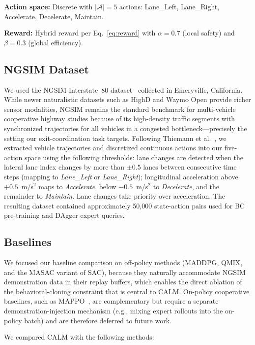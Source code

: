 \documentclass[journal]{IEEEtran}
\newcommand{\cA}{\mathcal{A}}
\begin{document}
\textbf{Action space:} Discrete with $|\cA| = 5$ actions: Lane\_Left, Lane\_Right, Accelerate, Decelerate, Maintain.

\textbf{Reward:} Hybrid reward per Eq.~\eqref{eq:reward} with $\alpha = 0.7$ (local safety) and $\beta = 0.3$ (global efficiency).

\subsection{NGSIM Dataset}

We used the NGSIM Interstate~80 dataset~\cite{ngsim2006} collected in Emeryville, California. While newer naturalistic datasets such as HighD and Waymo Open provide richer sensor modalities, NGSIM remains the standard benchmark for multi-vehicle cooperative highway studies because of its high-density traffic segments with synchronized trajectories for all vehicles in a congested bottleneck---precisely the setting our exit-coordination task targets. Following Thiemann et al.~\cite{thiemann2008estimating}, we extracted vehicle trajectories and discretized continuous actions into our five-action space using the following thresholds: lane changes are detected when the lateral lane index changes by more than $\pm 0.5$ lanes between consecutive time steps (mapping to \emph{Lane\_Left} or \emph{Lane\_Right}); longitudinal acceleration above $+0.5$~m/s$^2$ maps to \emph{Accelerate}, below $-0.5$~m/s$^2$ to \emph{Decelerate}, and the remainder to \emph{Maintain}. Lane changes take priority over acceleration. The resulting dataset contained approximately 50,000 state-action pairs used for BC pre-training and DAgger expert queries.

\subsection{Baselines}

We focused our baseline comparison on off-policy methods (MADDPG, QMIX, and the MASAC variant of SAC), because they naturally accommodate NGSIM demonstration data in their replay buffers, which enables the direct ablation of the behavioral-cloning constraint that is central to CALM. On-policy cooperative baselines, such as MAPPO~\cite{yu2022surprising}, are complementary but require a separate demonstration-injection mechanism (e.g., mixing expert rollouts into the on-policy batch) and are therefore deferred to future work.

We compared CALM with the following methods:
\end{document}
